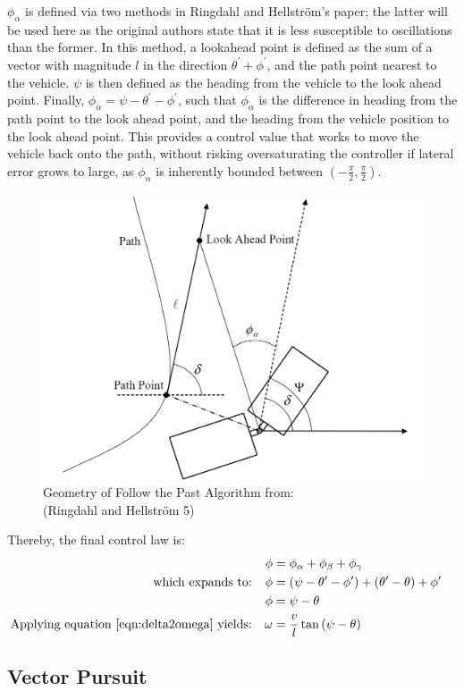 \documentclass[12pt]{article}
\begin{document}
\begin{flushleft}
$\phi_\alpha$ is defined via two methods in Ringdahl and Hellström's paper; the latter will be used here as the original authors state that it is less susceptible to oscillations than the former. In this method, a lookahead point is defined as the sum of a vector with magnitude $l$ in the direction $\theta^\prime+\phi^\prime$, and the path point nearest to the vehicle. $\psi$ is then defined as the heading from the vehicle to the look ahead point. Finally, $\phi_\alpha=\psi-\theta^\prime-\phi^\prime$, such that $\phi_\alpha$ is the difference in heading from the path point to the look ahead point, and the heading from the vehicle position to the look ahead point. This provides a control value that works to move the vehicle back onto the path, without risking oversaturating the controller if lateral error grows to large, as $\phi_\alpha$ is inherently bounded between $(-\frac{\pi}{2},\frac{\pi}{2})$.

\begin{figure}[H]
\centering
\includegraphics[width=0.5\linewidth]{images/RingdahlFtPDiagram}
\caption{Geometry of Follow the Past Algorithm from:\\(Ringdahl and Hellström 5)}
\label{img:ftp1}
\end{figure}

\newpage

Thereby, the final control law is:
\begin{subequations}
\begin{flalign}
&&\phi &= \phi_\alpha+\phi_\beta+\phi_\gamma &&\\
\text{which expands to:}
&&\phi &= (\psi-\theta^\prime-\phi^\prime) + (\theta^\prime-\theta) + \phi^\prime &&\\
&&\phi &= \psi-\theta &&\\
\text{Applying equation \ref{eqn:delta2omega} yields:}
&&\omega &= \frac{v}{l}\tan{(\psi-\theta)}&&
\end{flalign}
\end{subequations}


\subsection{Vector Pursuit}


\end{flushleft}
\end{document}
